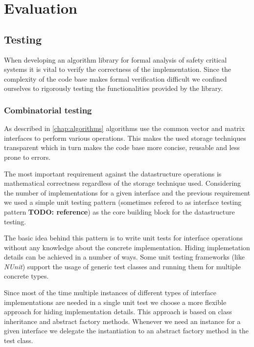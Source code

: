 \chapter{Evaluation}
\label{chap:evaluation}

\section{Testing}

When developing an algorithm library for formal analysis of safety critical systems it is vital to verify the correctness of the implementation. Since the complexity of the code base makes formal verification difficult we confined ourselves to rigorously testing the functionalities provided by the library.

\subsection{Combinatorial testing}

As described in \cref{chap:algorithms} algorithms use the common vector and matrix interfaces to perform various operations. This makes the used storage techniques transparent which in turn makes the code base more concise, reusable and less prone to errors. 

The most important requirement against the datastructure operations is mathematical correctness regardless of the storage technique used. Considering the number of implementations for a given interface and the previous requirement we used a simple unit testing pattern (sometimes refered to as interface testing pattern \textbf{TODO: reference}) as the core building block for the datastructure testing. 

The basic idea behind this pattern is to write unit tests for interface operations without any knowledge about the concrete implementation. Hiding implemetation details can be achieved in a number of ways. Some unit testing frameworks (like \emph{NUnit}) support the usage of generic test classes and running them for multiple concrete types.

Since most of the time multiple instances of different types of interface implementations are needed in a single unit test we choose a more flexible approach for hiding implementation details. This approach is based on class inheritance and abstract factory methods. Whenever we need an instance for a given interface we delegate the instantiation to an abstract factory method in the test class. 

